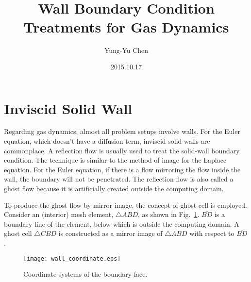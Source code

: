 \documentclass[a4paper,12pt,dvips]{article}
\begin{document}
\title{Wall Boundary Condition Treatments for Gas Dynamics}
\author{Yung-Yu Chen}
\date{2015.10.17}

\maketitle

\tableofcontents

\hspace{.5cm}

\section{Inviscid Solid Wall}

Regarding gas dynamics, almost all problem setups involve walls.  For the Euler
equation, which doesn't have a diffusion term, inviscid solid walls are
commonplace.  A reflection flow is usually used to treat the solid-wall
boundary condition\cite{laney_computational_1998}.  The technique is similar to
the method of image for the Laplace equation.  For the Euler equation, if there
is a flow mirroring the flow inside the wall, the boundary will not be
penetrated.  The reflection flow is also called a ghost flow because it is
artificially created outside the computing domain.

To produce the ghost flow by mirror image, the concept of ghost cell is
employed.  Consider an (interior) mesh element, $\bigtriangleup ABD$, as shown
in Fig.~\ref{f:wall_coordinate}.  $\overline{BD}$ is a boundary line of the
element, below which is outside the computing domain.  A ghost cell
$\bigtriangleup CBD$ is constructed as a mirror image of $\bigtriangleup ABD$
with respect to $\overline{BD}$.

\begin{figure}[htbp]
\centering
\texttt{[image: wall\_coordinate.eps]}
\caption{Coordinate systems of the boundary face.}
\label{f:wall_coordinate}
\end{figure}
\end{document}
